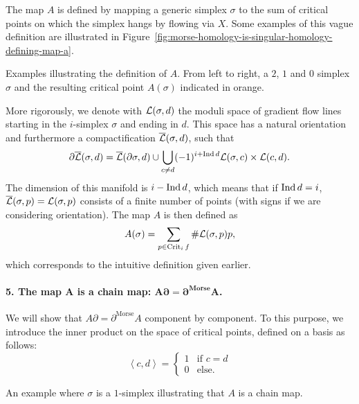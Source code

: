 \begin{myproof}
    The map $A$ is defined by mapping a generic simplex $\sigma$ to the sum of critical points on which the simplex hangs by flowing via $X$.
    Some examples of this vague definition are illustrated in Figure~\ref{fig:morse-homology-is-singular-homology-defining-map-a}.
    \begin{marginfigure}
        \centering
        \caption{
            Examples illustrating the definition of $A$.
            From left to right, a $2$, $1$ and  $0$ simplex $\sigma$ and the resulting critical point $A(\sigma)$ indicated in orange.
        }
        \label{fig:morse-homology-is-singular-homology-defining-map-a}
    \end{marginfigure}
    More rigorously, we denote with $\mathcal L(\sigma, d)$ the moduli space of gradient flow lines starting in the $i$-simplex $\sigma$ and ending in $d$.
    This space has a natural orientation and furthermore a compactification $\overline{\mathcal L}(\sigma, d)$, such that
    \[
    \partial \overline{\mathcal L}(\sigma, d) = \overline{\mathcal L}(\partial \sigma, d) \cup \bigcup_{c \neq d}  (-1)^{i + \operatorname{Ind} d} \mathcal L(\sigma, c) \times \mathcal L(c, d)
    .\] 
    The dimension of this manifold is $i - \operatorname{Ind} d$, which means that if  $\operatorname{Ind} d = i$,  $\overline{\mathcal L}(\sigma, p) = \mathcal L(\sigma, p)$ consists of a finite number of points (with signs if we are considering orientation).
    The map $A$ is then defined as
    \[
        A(\sigma) = \sum_{p \in \operatorname{Crit}_i f} \# \mathcal L(\sigma, p) p
    ,\] 
    which corresponds to the intuitive definition given earlier.


    \paragraph{5. The map  $\bm A$ is a chain map:  $\bm{A \partial = \partial^{\text{Morse}} A}$.}
    We will show that $A \partial = \partial^{\text{Morse}} A$ component by component. To this purpose, we introduce the inner product on the space of critical points, defined on a basis as follows:
    \[
        \left<c, d \right> = \begin{cases}
            1 & \text{if $c = d$}\\
            0 & \text{else.}
        \end{cases}
    \] 
\begin{marginfigure}
    \centering
    \caption{An example where $\sigma$ is a $1$-simplex illustrating that  $A$ is a chain map.}
    \label{fig:a-is-a-chain-map}
\end{marginfigure}


\end{myproof}
